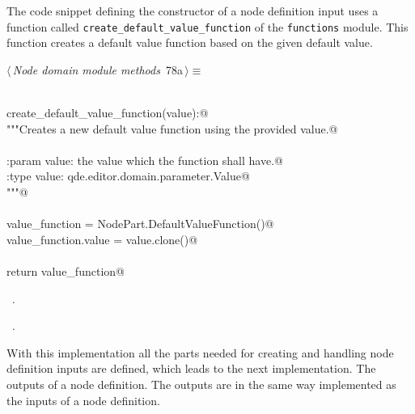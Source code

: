 \documentclass[
    a4paper,      %
    10pt,         %
    openright,    %
    notitlepage,  %
    parskip=half, %
]{scrreprt}       %
\theoremstyle{definition}                    %
\begin{document}
The code snippet defining the constructor of a node definition input uses a
function called \verb+create_default_value_function+ of the \verb+functions+
module. This function creates a default value function based on the given
default value.

\begin{flushleft} \small
\begin{minipage}{\linewidth}\label{scrap126}\raggedright\small
{} $\langle\,${\itshape Node domain module methods}\nobreak\ {\footnotesize {78a}}$\,\rangle\equiv$
\vspace{-1exm}
\begin{list}{}{} \item
\mbox{}\lstinline@@\\
\mbox{}\lstinline@def create_default_value_function(value):@\\
\mbox{}\lstinline@    """Creates a new default value function using the provided value.@\\
\mbox{}\lstinline@@\\
\mbox{}\lstinline@    :param value: the value which the function shall have.@\\
\mbox{}\lstinline@    :type  value: qde.editor.domain.parameter.Value@\\
\mbox{}\lstinline@    """@\\
\mbox{}\lstinline@@\\
\mbox{}\lstinline@    value_function = NodePart.DefaultValueFunction()@\\
\mbox{}\lstinline@    value_function.value = value.clone()@\\
\mbox{}\lstinline@@\\
\mbox{}\lstinline@    return value_function@{\NWsep}
\end{list}
\vspace{-1.5ex}
\footnotesize
\begin{list}{}{\setlength{\itemsep}{-\parsep}\setlength{\itemindent}{-\leftmargin}}
\item \NWtxtMacroDefBy\ .
\item \NWtxtMacroRefIn\ .

\item{}
\end{list}
\end{minipage}\vspace{4ex}
\end{flushleft}
With this implementation all the parts needed for creating and handling node
definition inputs are defined, which leads to the next implementation. The
outputs of a node definition. The outputs are in the same way implemented as
the inputs of a node definition.
\end{document}
